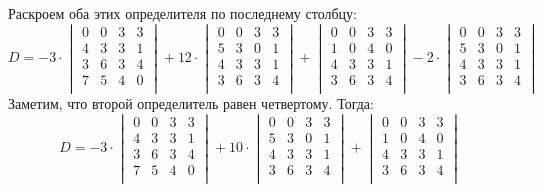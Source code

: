 	    Раскроем оба этих определителя по последнему столбцу:
	    \[
	    D = 
	    -3 \cdot
	    \begin{vmatrix}
	    0 & 0 & 3 & 3 \\
	    4 & 3 & 3 & 1 \\
	    3 & 6 & 3 & 4 \\
	    7 & 5 & 4 & 0 \\
	    \end{vmatrix} 
	    + 12 \cdot 
	    \begin{vmatrix}
	    0 & 0 & 3 & 3 \\
	    5 & 3 & 0 & 1 \\
	    4 & 3 & 3 & 1 \\
	    3 & 6 & 3 & 4 \\
	    \end{vmatrix}
	    +
	    \begin{vmatrix}
	    0 & 0 & 3 & 3 \\
	    1 & 0 & 4 & 0 \\
	    4 & 3 & 3 & 1 \\
	    3 & 6 & 3 & 4 \\
	    \end{vmatrix}
	    - 2 \cdot
	    \begin{vmatrix}
	    0 & 0 & 3 & 3 \\
	    5 & 3 & 0 & 1 \\
	    4 & 3 & 3 & 1 \\
	    3 & 6 & 3 & 4 \\
	    \end{vmatrix}
	    \]
	    Заметим, что второй определитель равен четвертому. Тогда:
	    \[
	    D =
	    -3 \cdot
	    \begin{vmatrix}
	    0 & 0 & 3 & 3 \\
	    4 & 3 & 3 & 1 \\
	    3 & 6 & 3 & 4 \\
	    7 & 5 & 4 & 0 \\
	    \end{vmatrix} 
	    + 10 \cdot 
	    \begin{vmatrix}
	    0 & 0 & 3 & 3 \\
	    5 & 3 & 0 & 1 \\
	    4 & 3 & 3 & 1 \\
	    3 & 6 & 3 & 4 \\
	    \end{vmatrix}
	    + 
	    \begin{vmatrix}
	    0 & 0 & 3 & 3 \\
	    1 & 0 & 4 & 0 \\
	    4 & 3 & 3 & 1 \\
	    3 & 6 & 3 & 4 \\
	    \end{vmatrix}
	    \]
